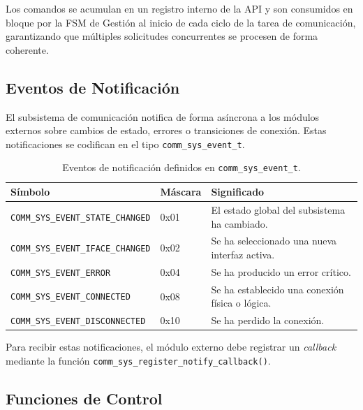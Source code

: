 Los comandos se acumulan en un registro interno de la API y son consumidos en bloque por la FSM de Gestión al inicio de cada ciclo de la tarea de comunicación, garantizando que múltiples solicitudes concurrentes se procesen de forma coherente.

\subsection{Eventos de Notificación}
\label{subsec:sys-eventos}

El subsistema de comunicación notifica de forma asíncrona a los módulos externos sobre cambios de estado, errores o transiciones de conexión. Estas notificaciones se codifican en el tipo \texttt{comm\_sys\_event\_t}.

\begin{table}[htbp]
    \centering
    \caption{Eventos de notificación definidos en \texttt{comm\_sys\_event\_t}.}
    \label{tab:comm-sys-event}
    \begin{tabular}{llp{7cm}}
        \toprule
        \textbf{Símbolo} & \textbf{Máscara} & \textbf{Significado} \\
        \midrule
        \texttt{COMM\_SYS\_EVENT\_STATE\_CHANGED} & 0x01 & El estado global del subsistema ha cambiado. \\
        \texttt{COMM\_SYS\_EVENT\_IFACE\_CHANGED} & 0x02 & Se ha seleccionado una nueva interfaz activa. \\
        \texttt{COMM\_SYS\_EVENT\_ERROR}          & 0x04 & Se ha producido un error crítico. \\
        \texttt{COMM\_SYS\_EVENT\_CONNECTED}      & 0x08 & Se ha establecido una conexión física o lógica. \\
        \texttt{COMM\_SYS\_EVENT\_DISCONNECTED}   & 0x10 & Se ha perdido la conexión. \\
        \bottomrule
    \end{tabular}
\end{table}

Para recibir estas notificaciones, el módulo externo debe registrar un \textit{callback} mediante la función \texttt{comm\_sys\_register\_notify\_callback()}.

\subsection{Funciones de Control}
\label{subsec:sys-control}

